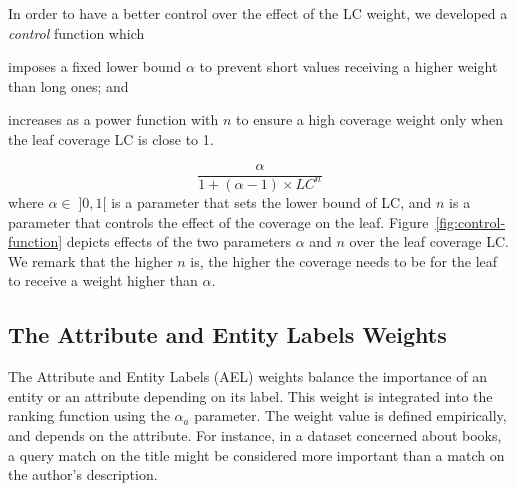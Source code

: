 In order to have a better control over the effect of the LC weight, we developed a \emph{control} function which
\begin{inparaenum}[(1)]
	\item imposes a fixed lower bound $\alpha$ to prevent short values receiving a higher weight than long ones; and
	\item increases as a power function with $n$ to ensure a high coverage weight only when the leaf coverage LC is close to 1.
\end{inparaenum}
\begin{equation}
\label{eq:lc-norm}
\frac{\alpha}{1+(\alpha-1)\times LC^n}
\end{equation}
where $\alpha \in \; ]0,1[$ is a parameter that sets the lower bound of LC, and $n$ is a parameter that controls the effect of the coverage on the leaf. Figure~\ref{fig:control-function} depicts effects of the two parameters $\alpha$ and $n$ over the leaf coverage LC. We remark that the higher $n$ is, the higher the coverage needs to be for the leaf to receive a weight higher than $\alpha$.

\subsection{The Attribute and Entity Labels Weights}
\label{sec:att-subj-w}

The Attribute and Entity Labels (AEL) weights balance the importance of an entity or an attribute depending on its label. This weight is integrated into the ranking function using the $\alpha_a$ parameter.
The weight value is defined empirically, and depends on the attribute. For instance, in a dataset concerned about books, a query match on the title might be considered more important than a match on the author's description.
